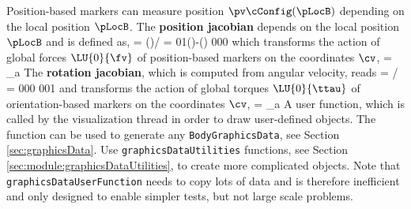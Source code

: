     Position-based markers can measure position $\pv\cConfig(\pLocB)$ depending on the local position $\pLocB$. 
    The {\bf position jacobian} depends on the local position $\pLocB$ and is defined as,
    \be
       = \partial {}\cConfig(\pLocB)\cCur / \partial \cv\cCur =  
                                                             {0}{1}{\cos(\theta)-\sin(\theta)} {0}{0}{0}
    \ee
    which transforms the action of global forces $\LU{0}{\fv}$ of position-based markers on the coordinates $\cv$,
    \be
      \Qm = \tp {}_a
    \ee
    The {\bf rotation jacobian}, which is computed from angular velocity, reads
    \be
       = \partial {}\cCur / \partial \dot \cv\cCur =  {0}{0}{0} {0}{0}{1}
    \ee
    and transforms the action of global torques $\LU{0}{\ttau}$ of orientation-based markers on the coordinates $\cv$,
    \be
      \Qm = \tp {}_a
    \ee
    A user function, which is called by the visualization thread in order to draw user-defined objects.
    The function can be used to generate any \texttt{BodyGraphicsData}, see Section \ref{sec:graphicsData}.
    Use \texttt{graphicsDataUtilities} functions, see Section \ref{sec:module:graphicsDataUtilities}, to create more complicated objects. 
    Note that \texttt{graphicsDataUserFunction} needs to copy lots of data and is therefore
    inefficient and only designed to enable simpler tests, but not large scale problems.

